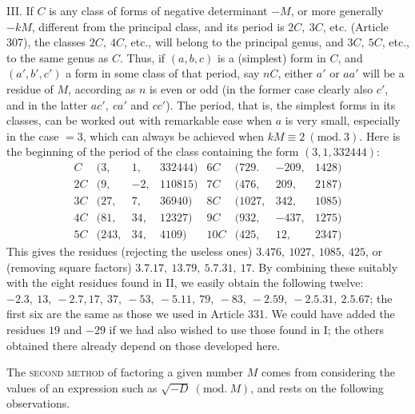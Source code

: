 III. If \(C\) is any class of forms of negative determinant \(-M\), or more generally \(-kM\), different from the principal class, and its period is \(2C,\allowbreak \ 3C\), etc. (Article 307), the classes \(2C,\allowbreak \ 4C\), etc., will belong to the principal genus, and \(3C,\allowbreak \ 5C\), etc., to the same genus as \(C\). Thus, if \((a,\allowbreak b,\allowbreak c)\) is a (simplest) form in \(C\), and \((a',\allowbreak b',\allowbreak c')\) a form in some class of that period, say \(nC\), either \(a'\) or \(aa'\) will be a residue of \(M\), according as \(n\) is even or odd (in the former case clearly also \(c'\), and in the latter \(ac',\allowbreak \ ca'\) and \(cc'\)). The period, that is, the simplest forms in its classes, can be worked out with remarkable ease when \(a\) is very small, especially in the case \(=3\), which can always be achieved when \(kM\equiv2\ (\mathrm{mod.}\ 3)\). Here is the beginning of the period of the class containing the form \((3,\allowbreak 1,\allowbreak 332444)\):
\[\begin{array}{crrr|crrr}C&\bigl(3,&1,&332444\bigr)&6C&\bigl(729.&-209,&1428\bigr)\\ 2C&\bigl(9,&-2,&110815\bigr)&7C&\bigl(476,&209,&2187\bigr)\\ 3C&\bigl(27,&7,&36940\bigr)&8C&\bigl(1027,&342,&1085\bigr)\\ 4C&\bigl(81,&34,&12327\bigr)&9C&\bigl(932,&-437,&1275\bigr)\\ 5C&\bigl(243,&34,&4109\bigr)&10C&\bigl(425,&12,&2347\bigr)\end{array}\] This gives the residues (rejecting the useless ones) \(3.476,\allowbreak \ 1027,\allowbreak \ 1085,\allowbreak \ 425\), or (removing square factors) \(3.7.17,\allowbreak \ 13.79,\allowbreak \ 5.7.31,\allowbreak \ 17\). By combining these suitably with the eight residues found in II, we easily obtain the following twelve: \(-2.3,\allowbreak \ 13,\allowbreak \ -2.7,\allowbreak 17,\allowbreak \ 37,\allowbreak \ -53,\allowbreak \ -5.11,\allowbreak \ 79,\allowbreak \ -83,\allowbreak \ -2.59,\allowbreak \ -2.5.31,\allowbreak \ 2.5.67\); the first six are the same as those we used in Article 331. We could have added the residues \(19\) and \(-29\) if we had also wished to use those found in I; the others obtained there already depend on those developed here.

The \textsc{second method} of factoring a given number \(M\) comes from considering the values of an expression such as \(\surd{-D}\ (\mathrm{mod.}\ M)\), and rests on the following observations.


